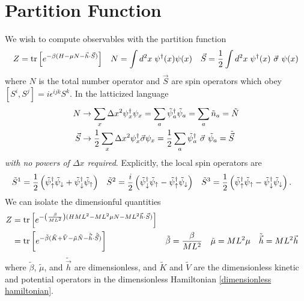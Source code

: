 \section{Partition Function}

We wish to compute observables with the partition function
\begin{align}
	Z
	&=
	\text{tr}\left[e^{-\beta(H-\mu N - \vec{h}\cdot\vec{S})}\right]
	&
	N &= \int d^2x\; \psi{}^{\dagger}(x)\psi(x)
	&
	\vec{S} = \frac{1}{2} \int d^2x\; \psi{}^{\dagger}(x) ~ \vec{\sigma} ~ \psi(x)
\end{align}
where $N$ is the total number operator and $\vec{S}$ are spin operators which obey $[S^i, S^j] = i\epsilon^{ijk} S^k$.
In the latticized language 
\begin{align}
	N
	&\rightarrow
	\sum_x \Delta x^2 \psi{}^{\dagger}_x \psi_x
	=
	\sum_a \tilde{\psi}{}^{\dagger}_a \tilde{\psi}_a
	=
	\sum_a \tilde{n}_a
	=
	\tilde{N}
	\\
	\vec{S}
	&\rightarrow
	\frac{1}{2} \sum_x \Delta x^2 \psi{}^{\dagger}_x \vec{\sigma} \psi_x
	=
	\frac{1}{2} \sum_a \tilde{\psi}{}^{\dagger}_a ~ \vec{\sigma} ~ \tilde{\psi}_a
	=
	\tilde{\vec{S}}
\end{align}
\emph{with no powers of $\Delta x$ required}.
Explicitly, the local spin operators are
\begin{align}
	\tilde{S}^1 &= \frac{1}{2} \left(\tilde{\psi}{}^{\dagger}_\uparrow \tilde{\psi}_\downarrow + \tilde{\psi}{}^{\dagger}_\downarrow \tilde{\psi}_\uparrow\right)
	&
	\tilde{S}^2 &= \frac{i}{2} \left( \tilde{\psi}{}^{\dagger}_\downarrow \tilde{\psi}_\uparrow - \tilde{\psi}{}^{\dagger}_\uparrow \tilde{\psi}_\downarrow\right)
	&
	\tilde{S}^3 &= \frac{1}{2} \left(\tilde{\psi}{}^{\dagger}_\uparrow \tilde{\psi}_\uparrow - \tilde{\psi}{}^{\dagger}_\downarrow \tilde{\psi}_\downarrow\right).
\end{align}
We can isolate the dimensionful quantities
\begin{align}
	Z
	&=
	\text{tr}\left[e^{-\left(\frac{\beta}{ML^2}\right)(HML^2 -M L^2 \mu N - M L^2 \vec{h} \cdot \vec{S})}\right]
\\
	&=
	\text{tr}\left[e^{-\tilde{\beta}(\tilde{K}+\tilde{V}-\tilde{\mu} \tilde{N} - \tilde{\vec{h}}\cdot\tilde{\vec{S}})}\right]
	&
	\tilde{\beta} &= \frac{\beta}{M L^2}
	&
	\tilde{\mu}   &= M L^2 \mu
	&
	\tilde{\vec{h}} &= M L^2 \vec{h}
	\label{eq:dimensionless}
\end{align}
where $\tilde{\beta}$, $\tilde{\mu}$, and $\tilde{\vec{h}}$ are dimensionless, and $\tilde{K}$ and $\tilde{V}$ are the dimensionless kinetic and potential operators in the dimensionless Hamiltonian \eqref{dimensionless hamiltonian}.

